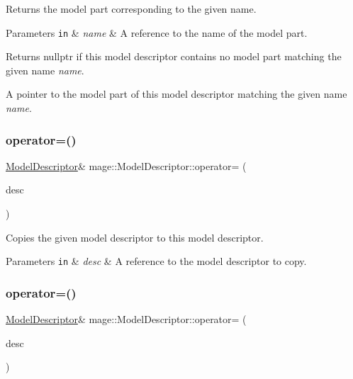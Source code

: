Returns the model part corresponding to the given name.


\begin{DoxyParams}[1]{Parameters}
\mbox{\tt in}  & {\em name} & A reference to the name of the model part. \\
\hline
\end{DoxyParams}
\begin{DoxyReturn}{Returns}
{\ttfamily nullptr} if this model descriptor contains no model part matching the given name {\itshape name}. 

A pointer to the model part of this model descriptor matching the given name {\itshape name}. 
\end{DoxyReturn}
\hypertarget{classmage_1_1_model_descriptor_a734b17224719896921e9f6252ee88483}{}\label{classmage_1_1_model_descriptor_a734b17224719896921e9f6252ee88483} 
\subsubsection{\texorpdfstring{operator=()}{operator=()}\hspace{0.1cm}{\footnotesize\ttfamily [1/2]}}
{\footnotesize\ttfamily \hyperlink{classmage_1_1_model_descriptor}{Model\+Descriptor}\& mage\+::\+Model\+Descriptor\+::operator= (\begin{DoxyParamCaption}\item[{const \hyperlink{classmage_1_1_model_descriptor}{Model\+Descriptor} \&}]{desc }\end{DoxyParamCaption})\hspace{0.3cm}{\ttfamily [delete]}}

Copies the given model descriptor to this model descriptor.


\begin{DoxyParams}[1]{Parameters}
\mbox{\tt in}  & {\em desc} & A reference to the model descriptor to copy. \\
\hline
\end{DoxyParams}
\hypertarget{classmage_1_1_model_descriptor_ae2ae685569c0ae534d9f0b5622a807d0}{}\label{classmage_1_1_model_descriptor_ae2ae685569c0ae534d9f0b5622a807d0} 
\subsubsection{\texorpdfstring{operator=()}{operator=()}\hspace{0.1cm}{\footnotesize\ttfamily [2/2]}}
{\footnotesize\ttfamily \hyperlink{classmage_1_1_model_descriptor}{Model\+Descriptor}\& mage\+::\+Model\+Descriptor\+::operator= (\begin{DoxyParamCaption}\item[{\hyperlink{classmage_1_1_model_descriptor}{Model\+Descriptor} \&\&}]{desc }\end{DoxyParamCaption})\hspace{0.3cm}{\ttfamily [delete]}}

